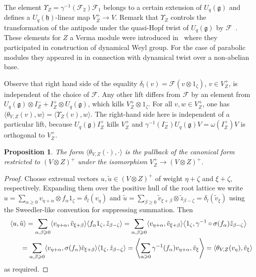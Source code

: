 \documentclass[pdftex]{sigma}
\numberwithin{equation}{section}
\newtheorem{Proposition}[Theorem]{Proposition}
 { \theoremstyle{definition}
\newtheorem{Definition}[Theorem]{Definition}
\newtheorem{Example}[Theorem]{Example}
\newtheorem{Remark}[Theorem]{Remark} }
\begin{document}
The element $\Upsilon_Z = \gamma^{-1}(\mathcal{F}_2)\mathcal{F}_1$ belongs to a certain extension of $U_q(\mathfrak{g})$ and defines a $U_q(\mathfrak{h})$-linear map $V^+_Z\to V$. Remark that $\Upsilon_Z$ controls the transformation of the antipode under the quasi-Hopf twist of $U_q(\mathfrak{g})$ by $\mathcal{F}$~\cite{D1}. These elements for $Z$ a Verma module were introduced in~\cite{EV} where they participated in construction of dynamical Weyl group. For the case of parabolic modules they appeared in \cite{KM} in connection with dynamical twist over a non-abelian base.

Observe that right hand side of the equality $\delta_l(v)=\mathcal{F}(v\otimes 1_\zeta)$, $v\in V^+_Z$, is independent of the choice of $\mathcal{F}$. Any other lift differs from $\mathcal{F}$ by an element from $U_q(\mathfrak{g})\otimes I_Z^-+ I^+_Z \otimes U_q(\mathfrak{g})$, which kills $V^+_Z\otimes 1_\zeta$. For all $v,w\in V^+_Z$, one has $\langle \theta_{V,Z}(v),w\rangle=\langle \Upsilon_Z(v),w\rangle$. The right-hand side here is independent of a particular lift, because $U_q(\mathfrak{g})I^+_Z$ kills $V^+_Z$ and $\gamma^{-1}(I^-_Z)U_q(\mathfrak{g})V= \omega(I^+_Z)V$ is orthogonal to $V^+_Z$.

\begin{Proposition} The form $\langle \theta_{V,Z}(\cdot),\cdot \rangle$ is the pullback of the canonical form restricted to \linebreak $(V \otimes Z)^+$ under the isomorphism $V^+_Z\to (V\otimes Z)^+$.
\end{Proposition}
\begin{proof}Choose extremal vectors $u, \tilde u \in (V\otimes Z)^+$ of weight $\eta +\zeta$ and $\xi+\zeta$, respectively. Expanding them over the positive hull of the root lattice we write $u=\sum_{\alpha\geqslant0}v_{\eta+\alpha}\otimes f_\alpha1_\zeta =\delta_l(v_\eta)$ and $\tilde u=\sum_{\beta\geqslant0} \tilde v_{\xi+\beta}\otimes \tilde z_{\beta-\zeta}=\delta_l(\tilde v_\xi)$ using the Sweedler-like convention for suppressing summation. Then{\samepage
\begin{gather*}
\langle u, \tilde u\rangle =\sum_{\alpha,\beta\geqslant0}\langle v_{\eta+\alpha},\tilde v_{\xi+\beta}\rangle \langle f_\alpha 1_\zeta, \tilde z_{\beta-\zeta}\rangle
=\sum_{\alpha,\beta\geqslant0}\langle v_{\eta+\alpha},\tilde v_{\xi+\beta}\rangle \big\langle 1_\zeta, \gamma^{-1}\circ \sigma(f_\alpha)\tilde z_{\beta-\zeta}\big\rangle\\
\hphantom{\langle u, \tilde u\rangle}{} =\sum_{\alpha,\beta\geqslant0}\langle v_{\eta+\alpha},\sigma(f_\alpha) \tilde v_{\xi+\beta}\rangle \langle 1_\zeta, \tilde z_{\beta-\zeta}\rangle
=\left\langle \sum_{\alpha\geqslant0}\gamma^{-1}(f_\alpha) v_{\eta+\alpha},\tilde v_{\xi}\right\rangle
=\langle \theta_{V,Z}(v_{\eta}),\tilde v_{\xi}\rangle
\end{gather*}
as required.}
\end{proof}
\end{document}
